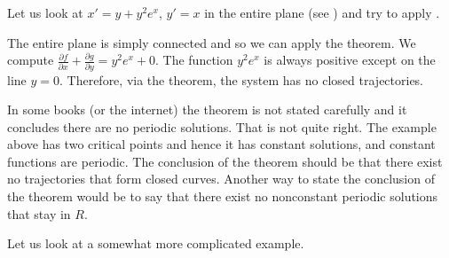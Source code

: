 \documentclass{ximera}
\begin{document}
\begin{example}
        Let us look at $x'=y+y^2e^x$, $y'=x$ in the entire plane (see ) and try to apply .
\end{example}
\begin{exampleSol}
    The entire plane is simply connected and so we can apply the theorem.  We compute $\frac{\partial f}{\partial x} + \frac{\partial g}{\partial y} = y^2e^x+ 0$.  The function $y^2e^x$ is always positive except on the line $y=0$.  Therefore, via the theorem, the system has no closed trajectories.
\end{exampleSol}

In some books (or the internet) the theorem is not stated carefully and it concludes there are no periodic solutions.  That is not quite right.  The example above has two critical points and hence it has constant solutions, and constant functions are periodic.  The conclusion of the theorem should be that there exist no trajectories that form closed curves.  Another way to state the conclusion of the theorem would be to say that there exist no nonconstant periodic solutions that stay in $R$.

Let us look at a somewhat more complicated example.
\end{document}
